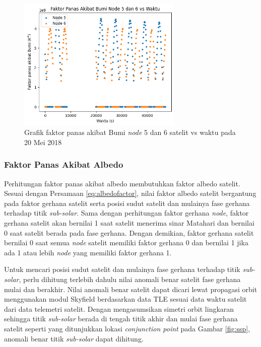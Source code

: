 \begin{figure}[H]
\setlength{}
\begin{center}
\includegraphics[width=0.7\textwidth]{fig/earth_node56_2018-05-20.png}
	\caption{Grafik faktor panas akibat Bumi \textit{node} 5 dan 6 satelit vs waktu pada 20 Mei 2018}
\label{fig:earth5620}
\end{center}
\end{figure}

\subsubsection{Faktor Panas Akibat Albedo}

Perhitungan faktor panas akibat albedo membutuhkan faktor albedo satelit.
Sesuai dengan Persamaan \ref{eq:albedofactor}, nilai faktor albedo satelit
bergantung pada faktor gerhana satelit serta posisi sudut satelit dan mulainya
fase gerhana terhadap titik \textit{sub-solar}. Sama dengan perhitungan faktor
gerhana \textit{node}, faktor gerhana satelit akan bernilai 1 saat satelit
menerima sinar Matahari dan bernilai 0 saat satelit berada pada fase gerhana.
Dengan demikian, faktor gerhana satelit bernilai 0 saat semua \textit{node}
satelit memiliki faktor gerhana 0 dan bernilai 1 jika ada 1 atau lebih
\textit{node} yang memiliki faktor gerhana 1.

Untuk mencari posisi sudut satelit dan mulainya fase gerhana terhadap titik
\textit{sub-solar}, perlu dihitung terlebih dahulu nilai anomali benar satelit
fase gerhana mulai dan berakhir. Nilai anomali benar satelit dapat dicari lewat
propagasi orbit menggunakan modul Skyfield berdasarkan data TLE sesuai data
waktu satelit dari data telemetri satelit. Dengan mengasumsikan simetri orbit
lingkaran sehingga titik \textit{sub-solar} berada di tengah titik akhir dan mulai fase gerhana satelit seperti yang ditunjukkan lokasi \textit{conjunction point} pada Gambar \ref{fig:ssp}, anomali benar titik \textit{sub-solar} dapat dihitung.

